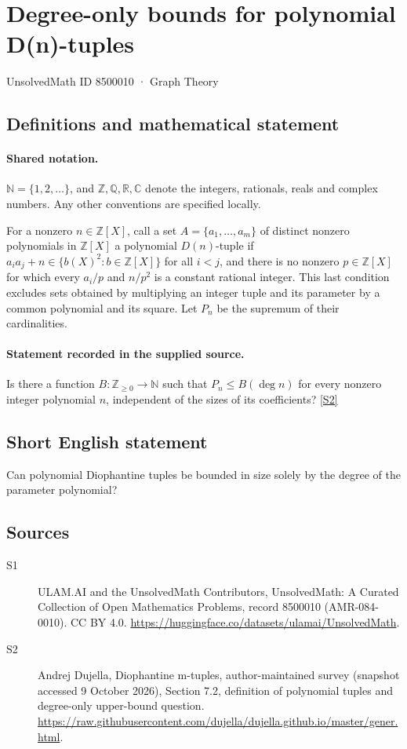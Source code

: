 \documentclass[11pt]{article}
\newcommand{\sref}[2]{\hyperlink{source:#1:#2}{[S#2]}}
\begin{document}
\setcounter{section}{8500009}
\section{Degree-only bounds for polynomial D(n)-tuples}\label{8500010}
{\small\sffamily UnsolvedMath ID 8500010 · Graph Theory}
\subsection{Definitions and mathematical statement}

\paragraph{Shared notation.}$\mathbb N=\{1,2,\ldots\}$, and $\mathbb Z,\mathbb Q,\mathbb R,\mathbb C$ denote the integers, rationals, reals and complex numbers. Any other conventions are specified locally.


For a nonzero $n\in\mathbb Z[X]$, call a set $A=\{a_1,\ldots,a_m\}$ of distinct nonzero polynomials in $\mathbb Z[X]$ a polynomial $D(n)$-tuple if $a_i a_j+n\in\{b(X)^2:b\in\mathbb Z[X]\}$ for all $i<j$, and there is no nonzero $p\in\mathbb Z[X]$ for which every $a_i/p$ and $n/p^2$ is a constant rational integer. This last condition excludes sets obtained by multiplying an integer tuple and its parameter by a common polynomial and its square. Let $P_n$ be the supremum of their cardinalities.
\paragraph{Statement recorded in the supplied source.}
Is there a function $B:\mathbb Z_{\ge0}\to\mathbb N$ such that $P_n\le B(\deg n)$ for every nonzero integer polynomial $n$, independent of the sizes of its coefficients? \sref{8500010}{2}
\subsection{Short English statement}
Can polynomial Diophantine tuples be bounded in size solely by the degree of the parameter polynomial?
\subsection{Sources}
\begin{description}
\item[\hypertarget{source:8500010:1}{S1}] ULAM.AI and the UnsolvedMath Contributors, UnsolvedMath: A Curated Collection of Open Mathematics Problems, record 8500010 (AMR-084-0010). CC BY 4.0. \url{https://huggingface.co/datasets/ulamai/UnsolvedMath}.
\item[\hypertarget{source:8500010:2}{S2}] Andrej Dujella, Diophantine m-tuples, author-maintained survey (snapshot accessed 9 October 2026), Section 7.2, definition of polynomial tuples and degree-only upper-bound question. \url{https://raw.githubusercontent.com/dujella/dujella.github.io/master/gener.html}.
\end{description}
\label{end:8500010}
\end{document}

